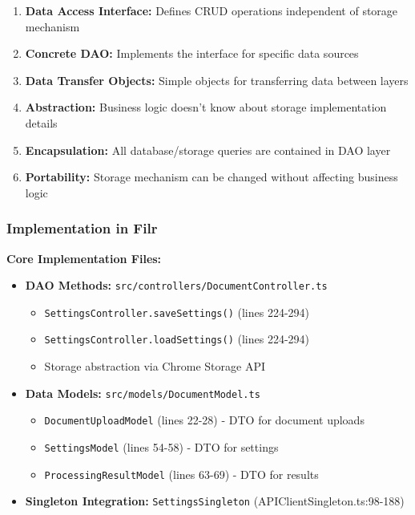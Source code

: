 \documentclass[11pt]{article}
\begin{document}
\begin{enumerate}[noitemsep]
    \item \textbf{Data Access Interface:} Defines CRUD operations independent of storage mechanism
    \item \textbf{Concrete DAO:} Implements the interface for specific data sources
    \item \textbf{Data Transfer Objects:} Simple objects for transferring data between layers
    \item \textbf{Abstraction:} Business logic doesn't know about storage implementation details
    \item \textbf{Encapsulation:} All database/storage queries are contained in DAO layer
    \item \textbf{Portability:} Storage mechanism can be changed without affecting business logic
\end{enumerate}

\subsubsection{Implementation in Filr}

\textbf{Core Implementation Files:}
\begin{itemize}[noitemsep]
    \item \textbf{DAO Methods:} \texttt{src/controllers/DocumentController.ts}
    \begin{itemize}[noitemsep]
        \item \texttt{SettingsController.saveSettings()} (lines 224-294)
        \item \texttt{SettingsController.loadSettings()} (lines 224-294)
        \item Storage abstraction via Chrome Storage API
    \end{itemize}
    \item \textbf{Data Models:} \texttt{src/models/DocumentModel.ts}
    \begin{itemize}[noitemsep]
        \item \texttt{DocumentUploadModel} (lines 22-28) - DTO for document uploads
        \item \texttt{SettingsModel} (lines 54-58) - DTO for settings
        \item \texttt{ProcessingResultModel} (lines 63-69) - DTO for results
    \end{itemize}
    \item \textbf{Singleton Integration:} \texttt{SettingsSingleton} (APIClientSingleton.ts:98-188)
\end{itemize}
\end{document}
